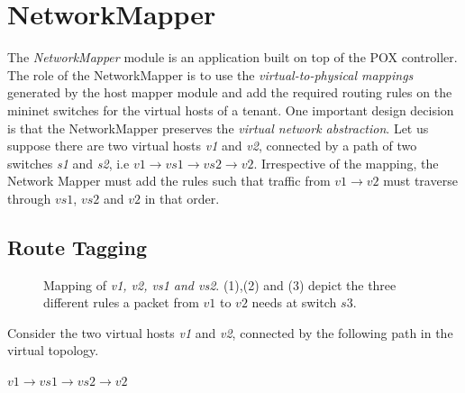 \section{NetworkMapper}
The \emph{NetworkMapper} module is an application built on top of the POX controller. The role of the NetworkMapper is to use the \emph{virtual-to-physical mappings} generated by the host mapper module and add the required routing rules on the mininet switches for the virtual hosts of a tenant. One important design decision is that the NetworkMapper preserves the \emph{virtual network abstraction}. Let us suppose there are two virtual hosts \emph{v1} and \emph{v2}, connected by a path of two switches \emph{s1} and \emph{s2}, i.e $v1 \rightarrow vs1 \rightarrow vs2 \rightarrow v2 $.  Irrespective of the mapping, the Network Mapper must add the rules such that traffic from $v1 \rightarrow v2 $ must traverse through $vs1$, $vs2 $ and $v2$ in that order. 

\subsection{Route Tagging}
\begin{figure}
	\noindent
	\caption{Mapping of \emph{v1, v2, vs1 and vs2}. (1),(2) and (3) depict the three different rules a packet from $v1$ to $v2$ needs at switch $s3$.}
\end{figure}
Consider the two virtual hosts \emph{v1} and \emph{v2}, connected by the following path  in the virtual topology.
\begin{center}
	$v1 \rightarrow vs1 \rightarrow vs2 \rightarrow v2 $
\end{center}

